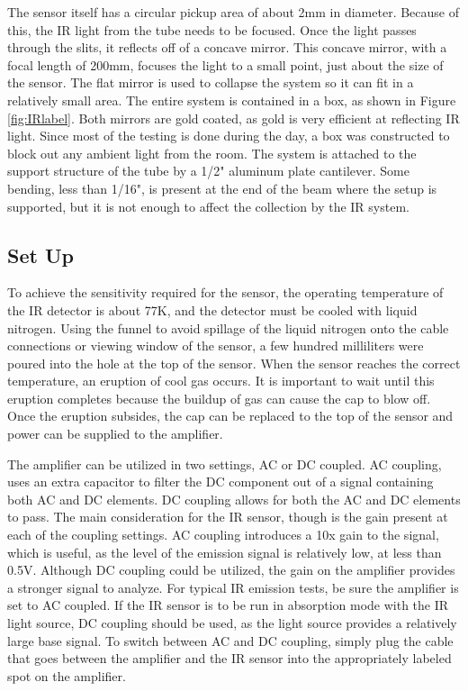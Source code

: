 The sensor itself has a circular pickup area of about 2mm in diameter. Because of this, the IR light from the tube needs to be focused. Once the light passes through the slits, it reflects off of a concave mirror. This concave mirror, with a focal length of 200mm, focuses the light to a small point, just about the size of the sensor. The flat mirror is used to collapse the system so it can fit in a relatively small area. The entire system is contained in a box, as shown in Figure \ref{fig:IRlabel}. Both mirrors are gold coated, as gold is very efficient at reflecting IR light. Since most of the testing is done during the day, a box was constructed to block out any ambient light from the room. The system is attached to the support structure of the tube by a 1/2" aluminum plate cantilever. Some bending, less than 1/16",  is present at the end of the beam where the setup is supported, but it is not enough to affect the collection by the IR system. 


\subsection{Set Up}


To achieve the sensitivity required for the sensor, the operating temperature of the IR detector is about 77K, and the detector must be cooled with liquid nitrogen. Using the funnel to avoid spillage of the liquid nitrogen onto the cable connections or viewing window of the sensor, a few hundred milliliters were poured into the hole at the top of the sensor. When the sensor reaches the correct temperature, an eruption of cool gas occurs. It is important to wait until this eruption completes because the buildup of gas can cause the cap to blow off. Once the eruption subsides, the cap can be replaced to the top of the sensor and power can be supplied to the amplifier. 

The amplifier can be utilized in two settings, AC or DC coupled. AC coupling, uses an extra capacitor to filter the DC component out of a signal containing both AC and DC elements. DC coupling allows for both the AC and DC elements to pass. The main consideration for the IR sensor, though is the gain present at each of the coupling settings. AC coupling introduces a 10x gain to the signal, which is useful, as the level of the emission signal is relatively low, at less than 0.5V. Although DC coupling could be utilized, the gain on the amplifier provides a stronger signal to analyze. For typical IR emission tests, be sure the amplifier is set to AC coupled. If the IR sensor is to be run in absorption mode with the IR light source, DC coupling should be used, as the light source provides a relatively large base signal. To switch between AC and DC coupling, simply plug the cable that goes between the amplifier and the IR sensor into the appropriately labeled spot on the amplifier.

